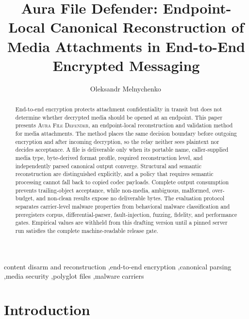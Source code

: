 \documentclass[preprint,12pt]{elsarticle}
\date{}
\newcommand{\AFD}{\textsc{Aura File Defender}}
\begin{document}
\begin{frontmatter}

\title{Aura File Defender: Endpoint-Local Canonical Reconstruction of Media Attachments in End-to-End Encrypted Messaging}

\author{Oleksandr Melnychenko\texorpdfstring{\,}{}\texorpdfstring{}{}}
\address{Khmelnytskyi National University, Khmelnytskyi, Ukraine}

\begin{abstract}
End-to-end encryption protects attachment confidentiality in transit but does
not determine whether decrypted media should be opened at an endpoint. This
paper presents \AFD, an endpoint-local reconstruction and validation method for
media attachments. The method places the same decision boundary before
outgoing encryption and after incoming decryption, so the relay neither sees
plaintext nor decides acceptance. A file is deliverable only when its portable
name, caller-supplied media type, byte-derived format profile, required
reconstruction level, and independently parsed canonical output converge.
Structural and semantic reconstruction are distinguished explicitly, and a
policy that requires semantic processing cannot fall back to copied codec
payloads. Complete output consumption prevents trailing-object acceptance, while
non-media, ambiguous, malformed, over-budget, and non-clean results expose no
deliverable bytes. The evaluation protocol separates carrier-level malware
properties from behavioral malware classification and preregisters corpus,
differential-parser, fault-injection, fuzzing, fidelity, and performance gates.
Empirical values are withheld from this drafting version until a pinned server
run satisfies the complete machine-readable release gate.
\end{abstract}

\begin{keyword}
content disarm and reconstruction \sep end-to-end encryption \sep canonical parsing \sep media security \sep polyglot files \sep malware carriers
\end{keyword}

\end{frontmatter}

\section{Introduction}\label{sec:introduction}
\end{document}
